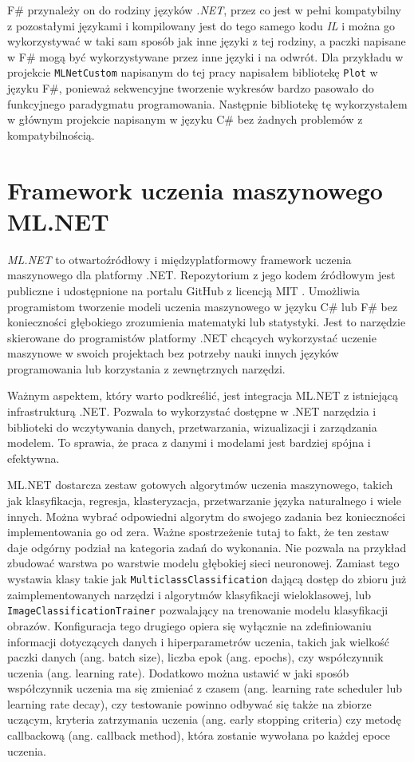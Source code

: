 F\# przynależy on do rodziny języków \emph{.NET}, przez co jest w pełni kompatybilny z pozostałymi językami i kompilowany jest do tego samego kodu \emph{IL} i można go wykorzystywać w taki sam sposób jak inne języki z tej rodziny, a paczki napisane w F\# mogą być wykorzystywane przez inne języki i na odwrót.
Dla przykładu w projekcie \lstinline{MLNetCustom} napisanym do tej pracy napisałem bibliotekę \lstinline{Plot} w języku F\#, ponieważ sekwencyjne tworzenie wykresów bardzo pasowało do funkcyjnego paradygmatu programowania.
Następnie bibliotekę tę wykorzystałem w głównym projekcie napisanym w języku C\# bez żadnych problemów z kompatybilnością.

\section{Framework uczenia maszynowego ML.NET}

\emph{ML.NET} to otwartoźródłowy i międzyplatformowy framework uczenia maszynowego dla platformy .NET.
Repozytorium z jego kodem źródłowym jest publiczne i udostępnione na portalu GitHub z licencją MIT \cite{dotnet-machinelearning-repo}.
Umożliwia programistom tworzenie modeli uczenia maszynowego w języku C\# lub F\# bez konieczności głębokiego zrozumienia matematyki lub statystyki.
Jest to narzędzie skierowane do programistów platformy .NET chcących wykorzystać uczenie maszynowe w swoich projektach bez potrzeby nauki innych języków programowania lub korzystania z zewnętrznych narzędzi.

Ważnym aspektem, który warto podkreślić, jest integracja ML.NET z istniejącą infrastrukturą .NET.
Pozwala to wykorzystać dostępne w .NET narzędzia i biblioteki do wczytywania danych, przetwarzania, wizualizacji i zarządzania modelem.
To sprawia, że praca z danymi i modelami jest bardziej spójna i efektywna.

ML.NET dostarcza zestaw gotowych algorytmów uczenia maszynowego, takich jak klasyfikacja, regresja, klasteryzacja, przetwarzanie języka naturalnego i wiele innych.
Można wybrać odpowiedni algorytm do swojego zadania bez konieczności implementowania go od zera.
Ważne spostrzeżenie tutaj to fakt, że ten zestaw daje odgórny podział na kategoria zadań do wykonania.
Nie pozwala na przykład zbudować warstwa po warstwie modelu głębokiej sieci neuronowej.
Zamiast tego wystawia klasy takie jak \lstinline{MulticlassClassification} dającą dostęp do zbioru już zaimplementowanych narzędzi i algorytmów klasyfikacji wieloklasowej, lub \lstinline{ImageClassificationTrainer} pozwalający na trenowanie modelu klasyfikacji obrazów.
Konfiguracja tego drugiego opiera się wyłącznie na zdefiniowaniu informacji dotyczących danych i hiperparametrów uczenia, takich jak wielkość paczki danych (ang. batch size), liczba epok (ang. epochs), czy współczynnik uczenia (ang. learning rate).
Dodatkowo można ustawić w jaki sposób współczynnik uczenia ma się zmieniać z czasem (ang. learning rate scheduler lub learning rate decay), czy testowanie powinno odbywać się także na zbiorze uczącym, kryteria zatrzymania uczenia (ang. early stopping criteria) czy metodę callbackową (ang. callback method), która zostanie wywołana po każdej epoce uczenia.

